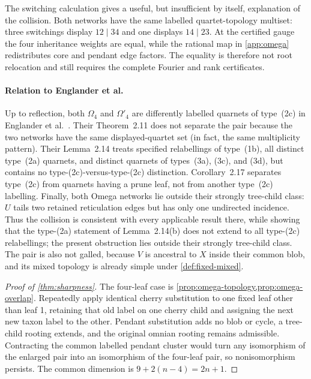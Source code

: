 \documentclass[11pt]{article}
\theoremstyle{remark}
\begin{document}
The switching calculation gives a useful, but insufficient by itself,
explanation of the collision.  Both networks have the same labelled
quartet-topology multiset: three switchings display $12\mid34$ and one
displays $14\mid23$.  At the certified gauge the four inheritance weights are
equal, while the rational map in \cref{app:omega} redistributes core and
pendant edge factors.  The equality is therefore not root relocation and
still requires the complete Fourier and rank certificates.

\paragraph{Relation to Englander et al.}
Up to reflection, both $\Omega_4$ and $\Omega'_4$ are differently labelled
quarnets of type~(2c) in Englander et
al.~\cite[Figure~5]{EnglanderEtAl2026}.  Their Theorem~2.11 does not separate
the pair because the two networks have the same displayed-quartet set (in
fact, the same multiplicity pattern).  Their Lemma~2.14 treats specified
relabellings of type~(1b), all distinct type~(2a) quarnets, and distinct
quarnets of types~(3a), (3c), and (3d), but contains no type-(2c)-versus-type-(2c)
distinction.  Corollary~2.17 separates type~(2c) from quarnets having a prune
leaf, not from another type~(2c) labelling.  Finally, both Omega networks lie
outside their strongly tree-child class: $U$ tails two retained reticulation
edges but has only one undirected incidence.  Thus the collision is
consistent with every applicable result there, while showing that
the type-(2a) statement of Lemma~2.14(b) does not extend to all type-(2c)
relabellings; the present obstruction lies outside their strongly tree-child
class.
The pair is also not galled, because $V$ is ancestral to $X$ inside their
common blob, and its mixed topology is already simple under
\cref{def:fixed-mixed}.

\begin{proof}[Proof of \cref{thm:sharpness}]
The four-leaf case is \cref{prop:omega-topology,prop:omega-overlap}.
Repeatedly apply identical cherry substitution to one fixed leaf other than
leaf 1, retaining that old label on one cherry child and assigning the next
new taxon label to the other.  Pendant
substitution adds no blob or cycle, a tree-child rooting extends, and the
original omnian rooting remains admissible.  Contracting the common labelled
pendant cluster would turn any isomorphism of the enlarged pair into an
isomorphism of the four-leaf pair, so nonisomorphism persists.  The common
dimension is $9+2(n-4)=2n+1$.
\end{proof}
\end{document}
